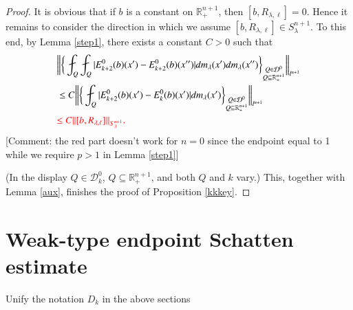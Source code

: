 \documentclass[12pt]{amsart}
\begin{document}
\begin{proof}
It is obvious that if $b$ is a constant on $\mathbb{R}^{n+1}_+$, then
$[b,R_{\lambda,\ell}]=0$. Hence it remains to  consider the direction in which we assume $[b,R_{\lambda,\ell}]\in S_\lambda^{n+1}$. To this end, by Lemma \ref{step1},
there exists a constant $C>0$ such that
\begin{align}\label{condineq}
&\bigg\|\bigg\{\fint_{Q}\fint_{Q}|E_{k+2}^0(b)(x') - E_{k+2}^0(b)(x'')|dm_\lambda(x')dm_\lambda(x'')\bigg\}_{\substack{Q\in \mathcal{D}^0\\Q\subseteq \mathbb{R}_+^{n+1}}}\bigg\|_{l^{n+1}}\nonumber\\
&\leq C\bigg\|\bigg\{\fint_{Q}|E_{k+2}^0(b)(x') - E_{k}^0(b)(x')|dm_\lambda(x')\bigg\}_{\substack{Q\in \mathcal{D}^0\\Q\subseteq \mathbb{R}_{+}^{n+1}}}\bigg\|_{l^{n+1}}\nonumber\\
&{\color{red}\leq C\|[b,R_{\lambda,\ell}]\|_{S_\lambda^{n+1}}.}
\end{align}
{\color{red}[Comment: the red part doesn't work for $n=0$ since the endpoint equal to 1 while we require $p>1$ in Lemma \ref{step1}]}

(In the display $Q\in \mathcal{D}_{k}^0$, $Q\subseteq \mathbb{R}_+^{n+1}$, and both $Q$ and $k$ vary.)
This, together with Lemma \ref{aux}, finishes the proof of Proposition \ref{kkkey}.
\end{proof}

\section{Weak-type endpoint Schatten estimate}
{\color{red}Unify the notation $D_k$ in the above sections}
\end{document}
